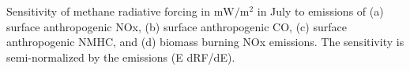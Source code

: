 Sensitivity of methane radiative forcing in $\mathrm{mW/m^2}$ in July to emissions of (a) surface anthropogenic NOx, (b) surface anthropogenic CO, (c) surface anthropogenic NMHC, and (d) biomass burning NOx emissions. The sensitivity is semi-normalized by the emissions (E dRF/dE). \label{fig:rfsens}